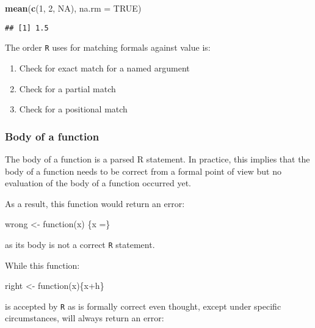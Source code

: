 \documentclass[]{book}
\newenvironment{Shaded}{\begin{snugshade}}{\end{snugshade}}
\newcommand{\KeywordTok}[1]{\textcolor[rgb]{0.13,0.29,0.53}{\textbf{{#1}}}}
\newcommand{\DataTypeTok}[1]{\textcolor[rgb]{0.13,0.29,0.53}{{#1}}}
\newcommand{\DecValTok}[1]{\textcolor[rgb]{0.00,0.00,0.81}{{#1}}}
\newcommand{\StringTok}[1]{\textcolor[rgb]{0.31,0.60,0.02}{{#1}}}
\newcommand{\OtherTok}[1]{\textcolor[rgb]{0.56,0.35,0.01}{{#1}}}
\newcommand{\NormalTok}[1]{{#1}}
\providecommand{\tightlist}{%
  \setlength{\itemsep}{0pt}\setlength{\parskip}{0pt}}
\def\tightlist{}
\begin{document}
\begin{Shaded}
\begin{Highlighting}[]
\KeywordTok{mean}\NormalTok{(}\KeywordTok{c}\NormalTok{(}\DecValTok{1}\NormalTok{, }\DecValTok{2}\NormalTok{, }\OtherTok{NA}\NormalTok{), }\DataTypeTok{na.rm =} \OtherTok{TRUE}\NormalTok{)}
\end{Highlighting}
\end{Shaded}

\begin{verbatim}
## [1] 1.5
\end{verbatim}

The order \texttt{R} uses for matching formals against value is:

\begin{enumerate}
\def\labelenumi{\arabic{enumi}.}
\tightlist
\item
  Check for exact match for a named argument
\item
  Check for a partial match
\item
  Check for a positional match
\end{enumerate}

\subsubsection{Body of a function}\label{body-of-a-function}

The body of a function is a parsed R statement. In practice, this
implies that the body of a function needs to be correct from a formal
point of view but no evaluation of the body of a function occurred yet.

As a result, this function would return an error:

\begin{Shaded}
\begin{Highlighting}[]
\NormalTok{wrong <-}\StringTok{ }\NormalTok{function(x) \{x =\}}
\end{Highlighting}
\end{Shaded}

as its body is not a correct \texttt{R} statement.

While this function:

\begin{Shaded}
\begin{Highlighting}[]
\NormalTok{right <-}\StringTok{ }\NormalTok{function(x)\{x+h\}}
\end{Highlighting}
\end{Shaded}

is accepted by \texttt{R} as is formally correct even thought, except
under specific circumstances, will always return an error:
\end{document}
